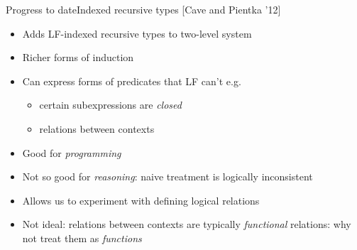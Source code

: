 \documentclass[usenames,dvipsnames]{beamer}
\begin{document}

\begin{frame}{Progress to date}{Indexed recursive types [Cave and Pientka '12]}
\begin{itemize}
\item Adds LF-indexed recursive types to two-level system
\item Richer forms of induction
\item Can express forms of predicates that LF can't e.g.
\begin{itemize}
\item certain subexpressions are \emph{closed}
\item relations between contexts
\end{itemize}
\item Good for \emph{programming}
\item Not so good for \emph{reasoning}: naive treatment is logically inconsistent
\item Allows us to experiment with defining logical relations
\item Not ideal: relations between contexts are typically \emph{functional} relations: why not treat them as \emph{functions}
\end{itemize}
\end{frame}
\end{document}

